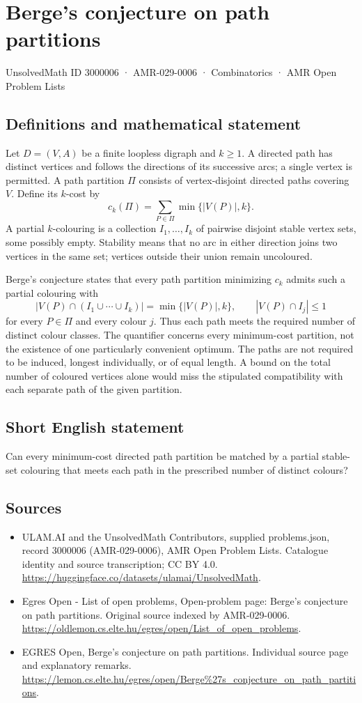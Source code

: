 \documentclass[11pt,a4paper]{article}
\begin{document}
\section*{Berge's conjecture on path partitions}\label{3000006}
{\small UnsolvedMath ID 3000006 · AMR-029-0006 · Combinatorics · AMR Open Problem Lists}
\subsection{Definitions and mathematical statement}
Let $D=(V,A)$ be a finite loopless digraph and $k\ge1$. A directed path
has distinct vertices and follows the directions of its successive arcs;
a single vertex is permitted. A path partition $\Pi$ consists of
vertex-disjoint directed paths covering $V$. Define its $k$-cost by
\[
                         c_k(\Pi)=\sum_{P\in\Pi}\min\{|V(P)|,k\}.
\]
A partial $k$-colouring is a collection $I_1,\ldots,I_k$ of pairwise
disjoint stable vertex sets, some possibly empty. Stability means that
no arc in either direction joins two vertices in the same set; vertices
outside their union remain uncoloured.

Berge's conjecture states that every path partition minimizing $c_k$
admits such a partial colouring with
\[
 |V(P)\cap(I_1\cup\cdots\cup I_k)|=\min\{|V(P)|,k\},
 \qquad |V(P)\cap I_j|\le1
\]
for every $P\in\Pi$ and every colour $j$.
Thus each path meets the required number of distinct colour classes.
The quantifier concerns every minimum-cost partition, not the existence
of one particularly convenient optimum. The paths are not required to
be induced, longest individually, or of equal length. A bound on the
total number of coloured vertices alone would miss the stipulated
compatibility with each separate path of the given partition.
\subsection{Short English statement}
Can every minimum-cost directed path partition be matched by a
partial stable-set colouring that meets each path in the prescribed number of distinct colours?
\subsection{Sources}
\begin{itemize}
\item[S1] ULAM.AI and the UnsolvedMath Contributors, supplied problems.json, record 3000006 (AMR-029-0006), AMR Open Problem Lists. Catalogue identity and source transcription; CC BY 4.0.
\url{https://huggingface.co/datasets/ulamai/UnsolvedMath}.
\item[S2] Egres Open - List of open problems, Open-problem page: Berge's conjecture on path partitions. Original source indexed by AMR-029-0006.
\url{https://oldlemon.cs.elte.hu/egres/open/List_of_open_problems}.
\item[S3] EGRES Open, Berge's conjecture on path partitions. Individual source page and explanatory remarks.
\url{https://lemon.cs.elte.hu/egres/open/Berge%27s_conjecture_on_path_partitions}.
\end{itemize}
\end{document}
